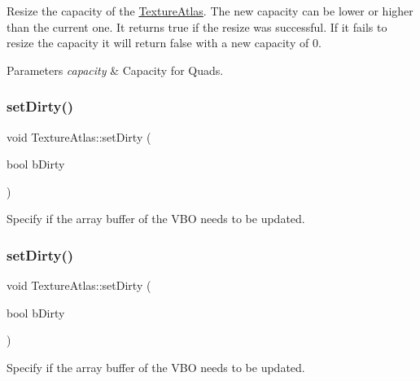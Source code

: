Resize the capacity of the \hyperlink{classTextureAtlas}{Texture\+Atlas}. The new capacity can be lower or higher than the current one. It returns true if the resize was successful. If it fails to resize the capacity it will return false with a new capacity of 0.


\begin{DoxyParams}{Parameters}
{\em capacity} & Capacity for Quads. \\
\hline
\end{DoxyParams}
\mbox{\label{classTextureAtlas_a8a0b4fcd17e2426ad339ba2d9c4d61c2}} 
\subsubsection{\texorpdfstring{set\+Dirty()}{setDirty()}\hspace{0.1cm}{\footnotesize\ttfamily [1/2]}}
{\footnotesize\ttfamily void Texture\+Atlas\+::set\+Dirty (\begin{DoxyParamCaption}\item[{bool}]{b\+Dirty }\end{DoxyParamCaption})\hspace{0.3cm}{\ttfamily [inline]}}

Specify if the array buffer of the V\+BO needs to be updated. \mbox{\label{classTextureAtlas_a8a0b4fcd17e2426ad339ba2d9c4d61c2}} 
\subsubsection{\texorpdfstring{set\+Dirty()}{setDirty()}\hspace{0.1cm}{\footnotesize\ttfamily [2/2]}}
{\footnotesize\ttfamily void Texture\+Atlas\+::set\+Dirty (\begin{DoxyParamCaption}\item[{bool}]{b\+Dirty }\end{DoxyParamCaption})\hspace{0.3cm}{\ttfamily [inline]}}

Specify if the array buffer of the V\+BO needs to be updated. \mbox{\label{classTextureAtlas_a59e3e4fea0e05019cfc94bea32122467}} 
